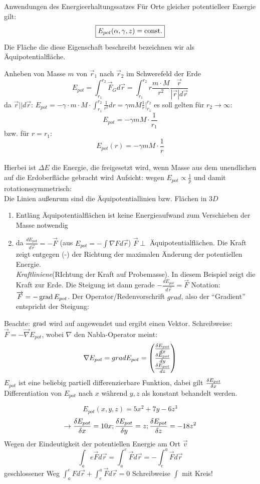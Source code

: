 \documentclass[a4paper,10pt]{scrartcl}
\begin{document}
\begin{seg}{Anwendungen des Energieerhaltungssatzes}
 Für Orte gleicher potentielleer Energie gilt:
\[
 \boxed{E_{pot}(\alpha,\gamma, z)=\text{const}.}
\]
Die Fläche die diese Eigenschaft beschreibt bezeichnen wir als Äquipotentialfläche.
 \begin{ex*}
 Anheben von Masse $m$ von $\vec r_1$ nach $\vec r_2$ im Schwerefeld der Erde
\[
 E_{pot}=\int_{r_1}^{r_2} \vec F_G d\vec{r}=\int_{r_1}^{r_2} r \frac{m\cdot M}{r^2}\frac{\vec r}{|\vec r| d\vec{r}}
\]
da $\vec r||d\vec r$: $E_{pot}=-\gamma\cdot m\cdot M\cdot \int_{r_1}^{r_2}\frac{1}{r^2} dr=\gamma mM\frac{1}{r}|_{r_1}^{r_2}$
 es soll gelten für $r_2\to \infty$:
\[
 \boxed{E_{pot}=-\gamma m M \cdot \frac{1}{r_1}}
\]
bzw. für $r=r_1$:
 \[
  \boxed{E_{pot}(r)=-\gamma m M \cdot \frac{1}{r}}
 \]
\\
Hierbei ist $\Delta E$ die Energie, die freigesetzt wird, wenn Masse aus dem unendlichen auf die Erdoberfläche gebracht wird
Aufsicht:
wegen $E_{pot} \propto \frac{1}{p}$ und damit rotationssymmetrisch:\\
Die Linien außenrum sind die Äquipotentiallinien bzw. Flächen in $3D$
\begin{enumerate}
\item Entläng Äquipotentialflächen ist keine Energieaufwand zum Verschieben der Masse notwendig
\item da $\frac{dE_{pot}}{d\vec{r}}=-\vec F$ (aus $E_{pot}=-\int \nabla F d\vec r$) 
$\vec F\perp$ Äquipotentialflächen. Die Kraft zeigt entgegen (-) der Richtung der maximalen Änderung der potentiellen Energie.\\
\emph{Kraftliniene}(RIchtung der Kraft auf Probemasse). In diesem Beispiel zeigt die Kraft zur Erde.
Die Steigung ist dann gerade $-\frac{d E_{pot}}{d\vec{r}}=\vec F$
Notation: $\overrightarrow{F}=-\operatorname{grad}{E_{pot}}$. Der Operator/Redenvorschrift $grad$, also der "`Gradient"' entspricht der Steigung:
\end{enumerate}
 Beachte: $\operatorname{grad}$ wird auf angewendet und ergibt einen Vektor. Schreibweise: $\vec F=-\vec \nabla E_{pot}$, wobei $\nabla$ den Nabla-Operator meint:
\[
 \nabla E_{pot}=grad E_{pot}=\begin{pmatrix} \frac{\delta E_{pot}}{dx}\\ \frac{\delta E_{pot}}{dy}\\ \frac{\delta E_{pot}}{dz} \end{pmatrix}
\]
$E_{pot}$ ist eine beliebig partiell differenzierbare Funktion, dabei gilt $\frac{\delta E_{pot}}{\delta x}$ Differentiation von  $E_{pot}$ nach $x$ während $y, z$ als konstant behandelt werden. 
\end{ex*}
\begin{ex*}
 \[
  E_{pot}(x,y,z)=5x^2+7y-6z^3
 \]
\[
 \to \frac{\delta E_{pot}}{\delta x}=10x; \frac{\delta E_{pot}}{\delta y}=z; \frac{\delta E_{pot}}{\delta z}=-18 z^2
\]
Wegen der Eindeutigkeit der potentiellen Energie am Ort $\vec v$ 
\[
 \int_{a}{e} \vec F d\vec r=\int_a^e \vec F d\vec r=-\int_e^a \vec F d\vec r
\]
geschlossener Weg $\int_a^e Fd\vec{r}+\int_e^a \vec F d\vec{r}=0$ Schreibweise $\int$ mit Kreis!
\end{ex*}


\end{seg}
\end{document}
